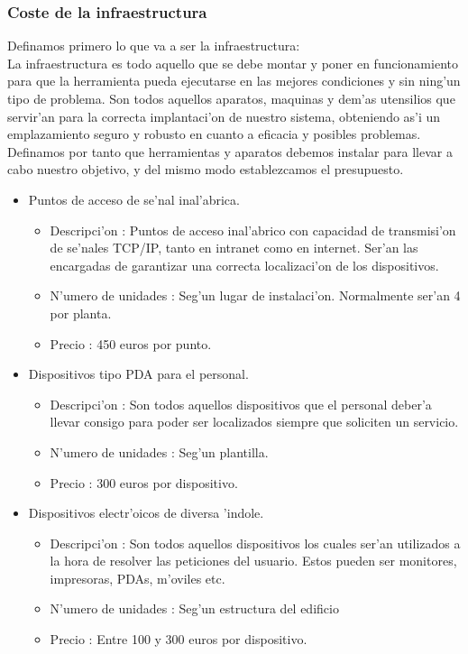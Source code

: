\subsubsection{Coste de la infraestructura}
Definamos primero lo que va a ser la infraestructura:\\ La infraestructura es todo aquello que se debe montar y poner en funcionamiento
para que la herramienta pueda ejecutarse en las mejores condiciones y sin ning'un tipo de problema. Son todos aquellos aparatos, maquinas
y dem'as utensilios que servir'an para la correcta implantaci'on de nuestro sistema, obteniendo as'i un emplazamiento seguro y 
robusto en cuanto a eficacia y posibles problemas.\\ Definamos por tanto que herramientas y aparatos debemos instalar para llevar
a cabo nuestro objetivo, y del mismo modo establezcamos el presupuesto.\\

\begin{itemize}
\item	Puntos de acceso de se'nal inal'abrica.
	\begin{itemize}
	\item Descripci'on : Puntos de acceso inal'abrico con capacidad de transmisi'on de se'nales TCP/IP, tanto en intranet como en internet.
				  Ser'an las encargadas de garantizar una correcta localizaci'on de los dispositivos.
	\item N'umero de unidades : Seg'un lugar de instalaci'on. Normalmente ser'an 4 por planta.
	\item Precio : 450 euros por punto.
	\end{itemize}
\item	Dispositivos tipo PDA para el personal.
	\begin{itemize}
	\item Descripci'on : Son todos aquellos dispositivos que el personal deber'a llevar consigo para poder ser localizados siempre que soliciten un servicio. 
	\item N'umero de unidades : Seg'un plantilla.
	\item Precio : 300 euros por dispositivo.
	\end{itemize}

\item	Dispositivos electr'oicos de diversa 'indole. 
	\begin{itemize}
	\item Descripci'on : Son todos aquellos dispositivos los cuales ser'an utilizados a la hora de resolver las peticiones del usuario.
	Estos pueden ser monitores, impresoras, PDAs, m'oviles etc.
	\item N'umero de unidades : Seg'un estructura del edificio
	\item Precio : Entre 100 y 300 euros por dispositivo.
	\end{itemize}

\end{itemize}

